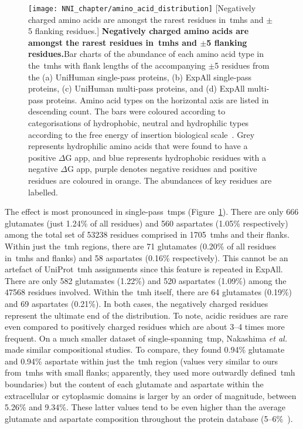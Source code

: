 \begin{figure}[!ht]
\centering
\texttt{[image: NNI\_chapter/amino\_acid\_distribution]}
[Negatively charged amino acids are amongst the rarest residues in~\gls{tmh}s and $\pm$5 flanking residues.] {\textbf{Negatively charged amino acids are amongst the rarest residues in~\gls{tmh}s and $\pm$5 flanking residues.}Bar charts of the abundance of each amino acid type in the~\gls{tmh}s with flank lengths of the accompanying $\pm$5 residues from the (a) UniHuman single-pass proteins, (b) ExpAll single-pass proteins, (c) UniHuman multi-pass proteins, and (d) ExpAll multi-pass proteins.
Amino acid types on the horizontal axis are listed in descending count.
The bars were coloured according to categorisations of hydrophobic, neutral and hydrophilic types according to the free energy of insertion biological scale~\cite{Hessa2005}.
Grey represents hydrophilic amino acids that were found to have a positive $\Delta$G app, and blue represents hydrophobic residues with a negative $\Delta$G app, purple denotes negative residues and positive residues are coloured in orange.
The abundances of key residues are labelled.}

\label{fig:amino_acid_distribution}
\end{figure}

The effect is most pronounced in single-pass~\gls{tmp}s (Figure~\ref{fig:amino_acid_distribution}).
There are only 666 glutamates (just 1.24\% of all residues) and 560 aspartates (1.05\% respectively) among the total set of 53238 residues comprised in 1705~\gls{tmh}s and their flanks.
Within just the~\gls{tmh} regions, there are 71 glutamates (0.20\% of all residues in~\gls{tmh}s and flanks) and 58 aspartates (0.16\% respectively).
This cannot be an artefact of UniProt~\gls{tmh} assignments since this feature is repeated in ExpAll.
There are only 582 glutamates (1.22\%) and 520 aspartates (1.09\%) among the 47568 residues involved.
Within the~\gls{tmh} itself, there are 64 glutamates (0.19\%) and 69 aspartates (0.21\%).
In both cases, the negatively charged residues represent the ultimate end of the distribution.
To note, acidic residues are rare even compared to positively charged residues which are about 3--4 times more frequent.
On a much smaller dataset of single-spanning~\gls{tmp}, Nakashima \textit{et al.}
~\cite{Nakashima1992} made similar compositional studies.
To compare, they found 0.94\% glutamate and 0.94\% aspartate within just the~\gls{tmh} region (values very similar to ours from~\gls{tmh}s with small flanks; apparently, they used more outwardly defined~\gls{tmh} boundaries) but the content of each glutamate and aspartate within the extracellular or cytoplasmic domains is larger by an order of magnitude, between 5.26\% and 9.34\%.
These latter values tend to be even higher than the average glutamate and aspartate composition throughout the protein database (5--6\%~\cite{Nakashima1992}).

